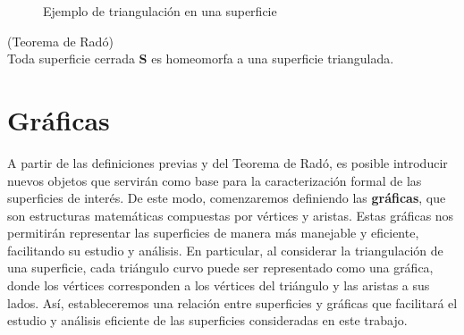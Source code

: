 \begin{figure}[H]
    \centering
    \label{fig:Triangulación}
    \caption{Ejemplo de triangulación en una superficie}
\end{figure}

\begin{teorema}(Teorema de Radó)\\
    Toda superficie cerrada \textbf{S} es homeomorfa a una superficie triangulada.
\end{teorema}

\section{Gráficas}

A partir de las definiciones previas y del Teorema de Radó, es posible introducir nuevos objetos que servirán como base para la caracterización formal de las superficies de interés. De este modo, comenzaremos definiendo las \textbf{gráficas}, que son estructuras matemáticas compuestas por vértices y aristas. Estas gráficas nos permitirán representar las superficies de manera más manejable y eficiente, facilitando su estudio y análisis. En particular, al considerar la triangulación de una superficie, cada triángulo curvo puede ser representado como una gráfica, donde los vértices corresponden a los vértices del triángulo y las aristas a sus lados. Así, estableceremos una relación entre superficies y gráficas que facilitará el estudio y análisis eficiente de las superficies consideradas en este trabajo.

